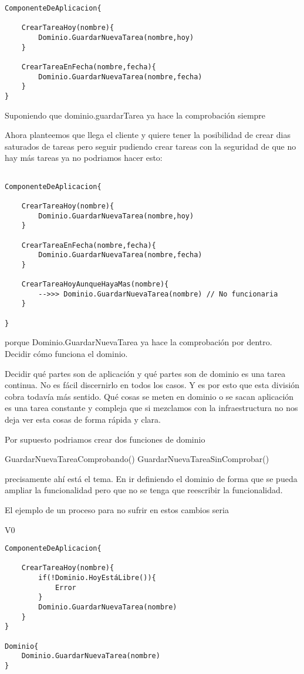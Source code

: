 \begin{verbatim}
ComponenteDeAplicacion{

    CrearTareaHoy(nombre){
        Dominio.GuardarNuevaTarea(nombre,hoy)
    }

    CrearTareaEnFecha(nombre,fecha){
        Dominio.GuardarNuevaTarea(nombre,fecha)
    }
}

\end{verbatim}

Suponiendo que dominio.guardarTarea ya hace la comprobación siempre


Ahora planteemos que llega el cliente y quiere tener la posibilidad de crear dias saturados de tareas pero seguir pudiendo crear tareas con la seguridad de que no hay más tareas ya no podriamos hacer esto:

\begin{verbatim}

ComponenteDeAplicacion{

    CrearTareaHoy(nombre){
        Dominio.GuardarNuevaTarea(nombre,hoy)
    }

    CrearTareaEnFecha(nombre,fecha){
        Dominio.GuardarNuevaTarea(nombre,fecha)
    }

    CrearTareaHoyAunqueHayaMas(nombre){
        -->>> Dominio.GuardarNuevaTarea(nombre) // No funcionaria
    }

}
\end{verbatim}

porque Dominio.GuardarNuevaTarea ya hace la comprobación por dentro. Decidir cómo funciona el dominio.

Decidir qué partes son de aplicación y qué partes son de dominio es una tarea continua. No es fácil discernirlo en todos los casos. Y es por esto que esta división cobra todavía más sentido. Qué cosas se meten en dominio o se sacan aplicación es una tarea constante y compleja que si mezclamos con la infraestructura no nos deja ver esta cosas de forma rápida y clara.

Por supuesto podriamos crear dos funciones de dominio

GuardarNuevaTareaComprobando()
GuardarNuevaTareaSinComprobar()

precisamente ahí está el tema. En ir definiendo el dominio de forma que se pueda ampliar la funcionalidad pero que no se tenga que reescribir la funcionalidad.

El ejemplo de un proceso para no sufrir en estos cambios seria

V0

\begin{verbatim}
ComponenteDeAplicacion{

    CrearTareaHoy(nombre){
        if(!Dominio.HoyEstáLibre()){
            Error
        }
        Dominio.GuardarNuevaTarea(nombre)
    }
}

Dominio{
    Dominio.GuardarNuevaTarea(nombre)
}

\end{verbatim}

